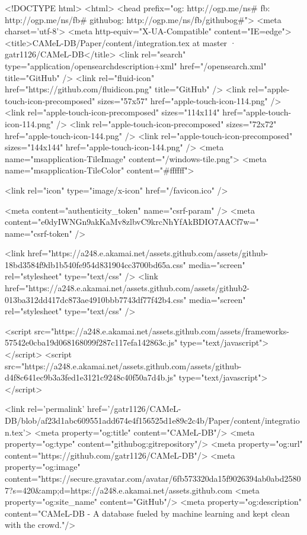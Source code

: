   


<!DOCTYPE html>
<html>
  <head prefix="og: http://ogp.me/ns# fb: http://ogp.me/ns/fb# githubog: http://ogp.me/ns/fb/githubog#">
    <meta charset='utf-8'>
    <meta http-equiv="X-UA-Compatible" content="IE=edge">
        <title>CAMeL-DB/Paper/content/integration.tex at master · gatr1126/CAMeL-DB</title>
    <link rel="search" type="application/opensearchdescription+xml" href="/opensearch.xml" title="GitHub" />
    <link rel="fluid-icon" href="https://github.com/fluidicon.png" title="GitHub" />
    <link rel="apple-touch-icon-precomposed" sizes="57x57" href="apple-touch-icon-114.png" />
    <link rel="apple-touch-icon-precomposed" sizes="114x114" href="apple-touch-icon-114.png" />
    <link rel="apple-touch-icon-precomposed" sizes="72x72" href="apple-touch-icon-144.png" />
    <link rel="apple-touch-icon-precomposed" sizes="144x144" href="apple-touch-icon-144.png" />
    <meta name="msapplication-TileImage" content="/windows-tile.png">
    <meta name="msapplication-TileColor" content="#ffffff">

    
    
    <link rel="icon" type="image/x-icon" href="/favicon.ico" />

    <meta content="authenticity_token" name="csrf-param" />
<meta content="e0dyIWNGn9akKaMv8zlbvC9krcNhYfAkBDIO7AACf7w=" name="csrf-token" />

    <link href="https://a248.e.akamai.net/assets.github.com/assets/github-18bd3584f9db1b540fe954d831904cc3700bd65a.css" media="screen" rel="stylesheet" type="text/css" />
    <link href="https://a248.e.akamai.net/assets.github.com/assets/github2-013ba312dd417dc873ae4910bbb7743df77f42b4.css" media="screen" rel="stylesheet" type="text/css" />
    


    <script src="https://a248.e.akamai.net/assets.github.com/assets/frameworks-57542e0cba19d068168099f287c117efa142863c.js" type="text/javascript"></script>
    <script src="https://a248.e.akamai.net/assets.github.com/assets/github-d4f8c641ec9b3a3fed1e3121c9248c40f50a7d4b.js" type="text/javascript"></script>
    

      <link rel='permalink' href='/gatr1126/CAMeL-DB/blob/af23d1abc609551add674e4f156525d1e89c2c4b/Paper/content/integration.tex'>
    <meta property="og:title" content="CAMeL-DB"/>
    <meta property="og:type" content="githubog:gitrepository"/>
    <meta property="og:url" content="https://github.com/gatr1126/CAMeL-DB"/>
    <meta property="og:image" content="https://secure.gravatar.com/avatar/6fb573320da15f9026394ab0abd25807?s=420&amp;d=https://a248.e.akamai.net/assets.github.com%
    <meta property="og:site_name" content="GitHub"/>
    <meta property="og:description" content="CAMeL-DB - A database fueled by machine learning and kept clean with the crowd."/>

